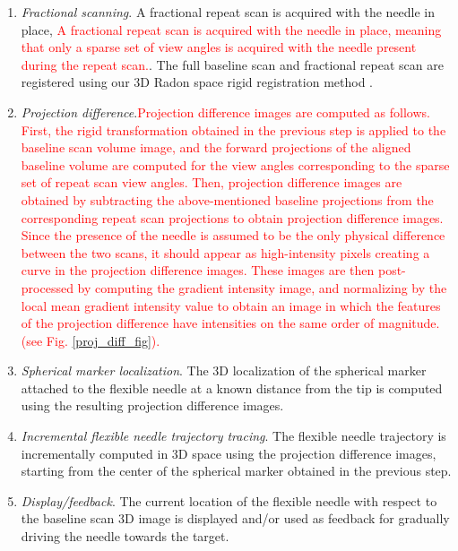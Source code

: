 \begin{enumerate}
\item \textit{Fractional scanning}. A fractional repeat scan is acquired with the needle in place, \textcolor{red}{A fractional repeat scan is acquired with the needle in place, meaning that only a sparse set of view angles is acquired with the needle present during the repeat scan.}. The full baseline scan and fractional repeat scan are registered using our 3D Radon space rigid registration method \cite{medan2017sparse}. \\[0.05ex]
\item \textit{Projection difference}.\textcolor{red}{Projection difference images are computed as follows. First, the rigid transformation obtained in the previous step is applied to the baseline scan volume image, and the forward projections of the aligned baseline volume are computed for the view angles corresponding to the sparse set of repeat scan view angles. Then, projection difference images are obtained by subtracting the above-mentioned baseline projections from the corresponding repeat scan projections to obtain projection difference images. Since the presence of the needle is assumed to be the only physical difference between the two scans, it should appear as high-intensity pixels creating a curve in the projection difference images. These images are then post-processed by computing the gradient intensity image, and normalizing by the local mean gradient intensity value to obtain an image in which the features of the projection difference have intensities on the same order of magnitude. (see Fig. \ref{proj_diff_fig}).} \\[0.05ex]
\item \textit{Spherical marker localization}. The 3D localization of the spherical marker attached to the flexible needle at a known distance from the tip is computed using the resulting projection difference images.\\[0.1ex]
\item \textit{Incremental flexible needle trajectory tracing}. The flexible needle trajectory is incrementally computed in 3D space using the projection difference images, starting from the center of the spherical marker obtained in the previous step. \\[0.05ex]
\item \textit{Display/feedback}. The current location of the flexible needle with respect to the baseline scan 3D image is displayed and/or used as feedback for gradually driving the needle towards the target.
\end{enumerate}
